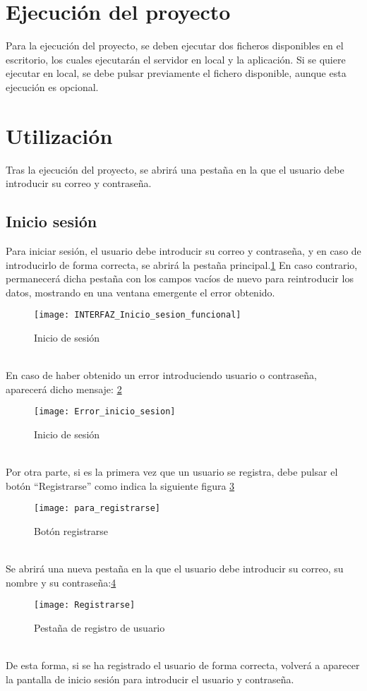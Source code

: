 \section{Ejecución del proyecto}
Para la ejecución del proyecto, se deben ejecutar dos ficheros disponibles en el escritorio, los cuales ejecutarán el servidor en local y la aplicación. Si se quiere ejecutar en local, se debe pulsar previamente el fichero disponible, aunque esta ejecución es opcional. 

\section{Utilización}
Tras la ejecución del proyecto, se abrirá una pestaña en la que el usuario debe introducir su correo y contraseña. 
\subsection{Inicio sesión}
Para iniciar sesión, el usuario debe introducir su correo y contraseña, y en caso de introducirlo de forma correcta, se abrirá la pestaña principal.\ref{fig:E.2.1.1} En caso contrario, permanecerá dicha pestaña con los campos vacíos de nuevo para reintroducir los datos, mostrando en una ventana emergente el error obtenido.  
\begin{figure}[h]
\centering
\texttt{[image: INTERFAZ\_Inicio\_sesion\_funcional]}
\caption{Inicio de sesión}
\label{fig:E.2.1.1}
\end{figure}
\\En caso de haber obtenido un error introduciendo usuario o contraseña, aparecerá dicho mensaje: \ref{fig:E.2.1.2}
\begin{figure}[h]
\centering
\texttt{[image: Error\_inicio\_sesion]}
\caption{Inicio de sesión}
\label{fig:E.2.1.2}
\end{figure}
\\Por otra parte, si es la primera vez que un usuario se registra, debe pulsar el botón ``Registrarse''  como indica la siguiente figura \ref{fig:E.2.1.3}
\begin{figure}[h]
\centering
\texttt{[image: para\_registrarse]}
\caption{Botón registrarse}
\label{fig:E.2.1.3}
\end{figure} 
\\Se abrirá una nueva pestaña en la que el usuario debe introducir su correo, su nombre y su contraseña:\ref{fig:E.2.1.4}
\begin{figure}[h]
\centering
\texttt{[image: Registrarse]}
\caption{Pestaña de registro de usuario}
\label{fig:E.2.1.4}
\end{figure} 
\\De esta forma, si se ha registrado el usuario de forma correcta, volverá a aparecer la pantalla de inicio sesión para introducir el usuario y contraseña.
